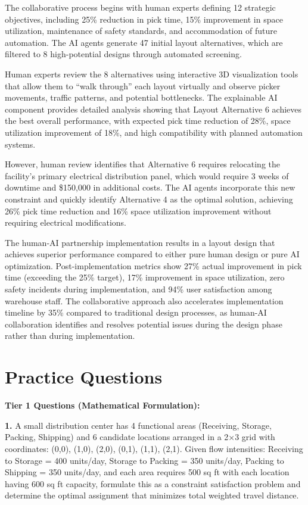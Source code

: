 \documentclass{article}
\begin{document}
The collaborative process begins with human experts defining 12 strategic objectives, including 25\% reduction in pick time, 15\% improvement in space utilization, maintenance of safety standards, and accommodation of future automation. The AI agents generate 47 initial layout alternatives, which are filtered to 8 high-potential designs through automated screening.

Human experts review the 8 alternatives using interactive 3D visualization tools that allow them to ``walk through'' each layout virtually and observe picker movements, traffic patterns, and potential bottlenecks. The explainable AI component provides detailed analysis showing that Layout Alternative 6 achieves the best overall performance, with expected pick time reduction of 28\%, space utilization improvement of 18\%, and high compatibility with planned automation systems.

However, human review identifies that Alternative 6 requires relocating the facility's primary electrical distribution panel, which would require 3 weeks of downtime and \$150,000 in additional costs. The AI agents incorporate this new constraint and quickly identify Alternative 4 as the optimal solution, achieving 26\% pick time reduction and 16\% space utilization improvement without requiring electrical modifications.

The human-AI partnership implementation results in a layout design that achieves superior performance compared to either pure human design or pure AI optimization. Post-implementation metrics show 27\% actual improvement in pick time (exceeding the 25\% target), 17\% improvement in space utilization, zero safety incidents during implementation, and 94\% user satisfaction among warehouse staff. The collaborative approach also accelerates implementation timeline by 35\% compared to traditional design processes, as human-AI collaboration identifies and resolves potential issues during the design phase rather than during implementation.

\section{Practice Questions}

\textbf{Tier 1 Questions (Mathematical Formulation):}

\textbf{1.} A small distribution center has 4 functional areas (Receiving, Storage, Packing, Shipping) and 6 candidate locations arranged in a 2×3 grid with coordinates: (0,0), (1,0), (2,0), (0,1), (1,1), (2,1). Given flow intensities: Receiving to Storage = 400 units/day, Storage to Packing = 350 units/day, Packing to Shipping = 350 units/day, and each area requires 500 sq ft with each location having 600 sq ft capacity, formulate this as a constraint satisfaction problem and determine the optimal assignment that minimizes total weighted travel distance.
\end{document}

